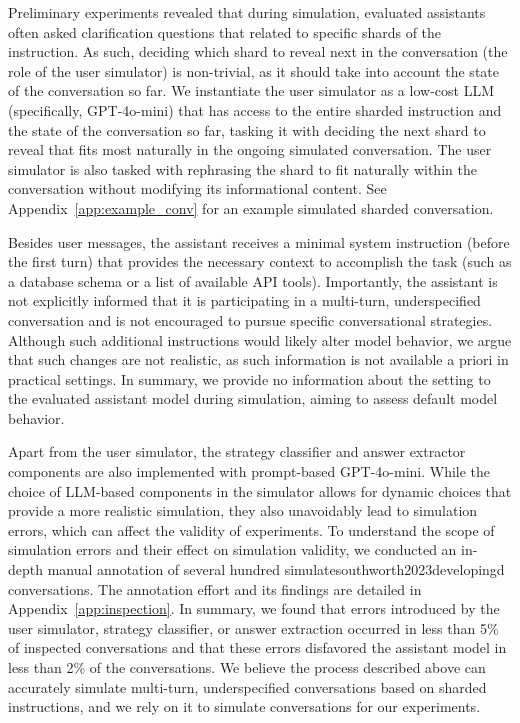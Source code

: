 \documentclass{article}
\begin{document}
Preliminary experiments revealed that during simulation, evaluated assistants often asked clarification questions that related to specific shards of the instruction. As such, deciding which shard to reveal next in the conversation (the role of the user simulator) is non-trivial, as it should take into account the state of the conversation so far. We instantiate the user simulator as a low-cost LLM (specifically, GPT-4o-mini) that has access to the entire sharded instruction and the state of the conversation so far, tasking it with deciding the next shard to reveal that fits most naturally in the ongoing simulated conversation. The user simulator is also tasked with rephrasing the shard to fit naturally within the conversation without modifying its informational content. See Appendix~\ref{app:example_conv} for an example simulated sharded conversation.

Besides user messages, the assistant receives a minimal system instruction (before the first turn) that provides the necessary context to accomplish the task (such as a database schema or a list of available API tools). Importantly, the assistant is not explicitly informed that it is participating in a multi-turn, underspecified conversation and is not encouraged to pursue specific conversational strategies. Although such additional instructions would likely alter model behavior, we argue that such changes are not realistic, as such information is not available a priori in practical settings. In summary, we provide no information about the setting to the evaluated assistant model during simulation, aiming to assess default model behavior.

Apart from the user simulator, the strategy classifier and answer extractor components are also implemented with prompt-based GPT-4o-mini. While the choice of LLM-based components in the simulator allows for dynamic choices that provide a more realistic simulation, they also unavoidably lead to simulation errors, which can affect the validity of experiments. To understand the scope of simulation errors and their effect on simulation validity, we conducted an in-depth manual annotation of several hundred simulatesouthworth2023developingd conversations. The annotation effort and its findings are detailed in Appendix~\ref{app:inspection}. In summary, we found that errors introduced by the user simulator, strategy classifier, or answer extraction occurred in less than 5\% of inspected conversations and that these errors disfavored the assistant model in less than 2\% of the conversations. We believe the process described above can accurately simulate multi-turn, underspecified conversations based on sharded instructions, and we rely on it to simulate conversations for our experiments.
\end{document}
